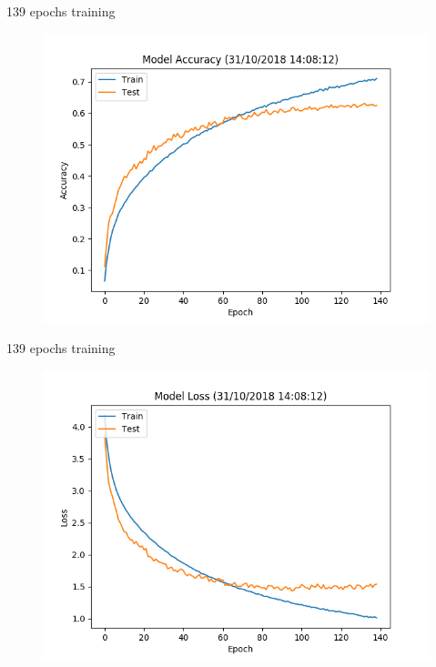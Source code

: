 \documentclass{beamer}
\begin{document}
\begin{frame}[fragile]{139 epochs training}
 \begin{figure}[H]
  \centering
  \includegraphics[scale=0.55]{img/accuracy_139.png}
 \end{figure}
\end{frame}


\begin{frame}[fragile]{139 epochs training}
 \begin{figure}[H]
  \centering
  \includegraphics[scale=0.55]{img/loss_139.png}
 \end{figure}
\end{frame}
\end{document}
